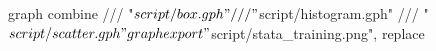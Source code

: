 graph combine ///
        "$script/box.gph" ///
        "$script/histogram.gph" ///     
        "$script/scatter.gph"
graph export "$script/stata_training.png", replace

